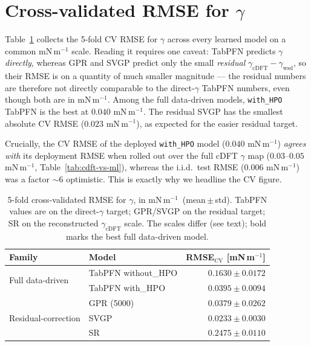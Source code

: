 \documentclass[11pt]{article}
\newcommand{\gmm}{mN\,m$^{-1}$}
\begin{document}
\section{Cross-validated RMSE for $\gamma$}
\label{sec:cv}
Table~\ref{tab:gamma-comb} collects the 5-fold CV RMSE for $\gamma$ across every
learned model on a common \gmm{} scale. Reading it requires one caveat: TabPFN
predicts $\gamma$ \emph{directly}, whereas GPR and SVGP predict only the small
\emph{residual} $\gamma_\mathrm{cDFT}-\gamma_\mathrm{wsd}$, so their RMSE is on a
quantity of much smaller magnitude --- the residual numbers are therefore not
directly comparable to the direct-$\gamma$ TabPFN numbers, even though both are
in \gmm. Among the full data-driven models, \texttt{with\_HPO} TabPFN is the
best at $0.040$ \gmm. The residual SVGP has the smallest absolute CV RMSE
($0.023$ \gmm), as expected for the easier residual target.

Crucially, the CV RMSE of the deployed \texttt{with\_HPO} model ($0.040$ \gmm)
\emph{agrees with} its deployment RMSE when rolled out over the full cDFT
$\gamma$ map ($0.03$--$0.05$ \gmm, Table~\ref{tab:cdft-vs-ml}), whereas the
i.i.d.\ test RMSE ($0.006$ \gmm) was a factor $\sim$6 optimistic. This is exactly
why we headline the CV figure.

\begin{table}[t]
\centering
\caption{5-fold cross-validated RMSE for $\gamma$, in \gmm\ (mean\,$\pm$\,std).
TabPFN values are on the direct-$\gamma$ target; GPR/SVGP on the residual
target; SR on the reconstructed $\gamma_\mathrm{cDFT}$ scale. The scales differ
(see text); bold marks the best full data-driven model.}
\label{tab:gamma-comb}
\small
\begin{tabular}{llr}
\toprule
Family & Model & RMSE$_\mathrm{CV}$ [\gmm] \\
\midrule
\multirow{2}{*}{Full data-driven}
 & TabPFN without\_HPO & $0.1630 \pm 0.0172$ \\
 & TabPFN with\_HPO    & $\mathbf{0.0395 \pm 0.0094}$ \\
\midrule
\multirow{3}{*}{Residual-correction}
 & GPR (5000)          & $0.0379 \pm 0.0262$ \\
 & SVGP                & $0.0233 \pm 0.0030$ \\
 & SR                  & $0.2475 \pm 0.0110$ \\
\bottomrule
\end{tabular}
\end{table}
\end{document}
